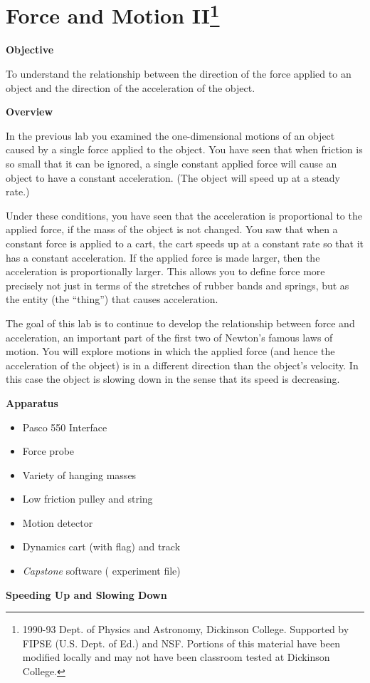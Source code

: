 
\section{Force and Motion II\footnote{
1990-93 Dept. of Physics and Astronomy, Dickinson College. Supported by FIPSE
(U.S. Dept. of Ed.) and NSF. Portions of this material have been modified locally
and may not have been classroom tested at Dickinson College.
}}

\makelabheader %

\textbf{Objective} 

To understand the relationship between the direction of the force applied to
an object and the direction of the acceleration of the object. 

\textbf{Overview} 

In the previous lab you examined the one-dimensional motions of an object caused
by a single force applied to the object. You have seen that when friction is
so small that it can be ignored, a single constant applied force will cause
an object to have a constant acceleration. (The object will speed up at a steady
rate.) 

Under these conditions, you have seen that the acceleration is proportional
to the applied force, if the mass of the object is not changed. You saw that
when a constant force is applied to a cart, the cart speeds up at a constant
rate so that it has a constant acceleration. If the applied force is made larger,
then the acceleration is proportionally larger. This allows you to define force
more precisely not just in terms of the stretches of rubber bands and springs,
but as the entity (the ``thing'') that causes acceleration.

The goal of this lab is to continue to develop the relationship between force
and acceleration, an important part of the first two of Newton's famous laws
of motion. You will explore motions in which the applied force (and hence the
acceleration of the object) is in a different direction than the object's velocity.
In this case the object is slowing down in the sense that its speed is decreasing.

\textbf{Apparatus }

\begin{itemize}
\item Pasco 550 Interface
\item Force probe 
\item Variety of hanging masses 
\item Low friction pulley and string 
\item Motion detector 
\item Dynamics cart (with flag) and track 
\item \textit{Capstone} software ( experiment file)
\end{itemize}
\textbf{Speeding Up and Slowing Down }

